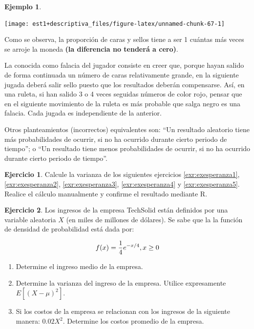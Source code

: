 \documentclass[
  11pt,
]{book}
\providecommand{\tightlist}{%
  \setlength{\itemsep}{0pt}\setlength{\parskip}{0pt}}
\theoremstyle{definition}
\theoremstyle{definition}
\newtheorem{example}{Ejemplo}[chapter]
\theoremstyle{definition}
\newtheorem{exercise}{Ejercicio}[chapter]
\theoremstyle{definition}
\theoremstyle{remark}
\begin{document}
\begin{example}
\begin{center}\texttt{[image: est1+descriptiva\_files/figure-latex/unnamed-chunk-67-1]} \end{center}

Como se observa, la proporción de caras y sellos tiene a ser 1 cuántas más veces se arroje la moneda \textbf{(la diferencia no tenderá a cero)}.

La conocida como falacia del jugador consiste en creer que, porque hayan salido de forma continuada un número de caras relativamente grande, en la siguiente jugada deberá salir sello puesto que los resultados deberán compensarse. Así, en una ruleta, si han salido 3 o 4 veces seguidas números de color rojo, pensar que en el siguiente movimiento de la ruleta es más probable que salga negro es una falacia. Cada jugada es independiente de la anterior.

Otros planteamientos (incorrectos) equivalentes son: ``Un resultado aleatorio tiene más probabilidades de ocurrir, si no ha ocurrido durante cierto periodo de tiempo''; o ``Un resultado tiene menos probabilidades de ocurrir, si no ha ocurrido durante cierto periodo de tiempo''.
\end{example}

\begin{exercise}
Calcule la varianza de los siguientes ejercicios \ref{exr:exesperanza1}, \ref{exr:exesperanza2}, \ref{exr:exesperanza3}, \ref{exr:exesperanza4} y \ref{exr:exesperanza5}. Realice el cálculo manualmente y confirme el resultado mediante R.
\end{exercise}

\begin{exercise}

Los ingresos de la empresa TechSolid están definidos por una variable aleatoria \(X\) (en miles de millones de dólares). Se sabe que la la función de densidad de probabilidad está dada por:

\begin{equation}
\notag
f(x) = \frac{1}{4} e^{-x/4},  x \geq 0
\end{equation}

\begin{enumerate}
\def\labelenumi{\arabic{enumi}.}
\tightlist
\item
  Determine el ingreso medio de la empresa.
\item
  Determine la varianza del ingreso de la empresa. Utilice expresamente \(E[(X-\mu)^2]\).
\item
  Si los costos de la empresa se relacionan con los ingresos de la siguiente manera: \(0.02X^2\). Determine los costos promedio de la empresa.
\end{enumerate}

\end{exercise}
\end{document}

